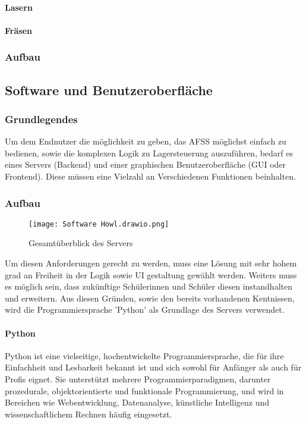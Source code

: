 \paragraph{Lasern}
\paragraph{Fräsen}

\subsubsection{Aufbau}

\subsection{Software und Benutzeroberfläche}

\subsubsection{Grundlegendes}

Um dem Endnutzer die möglichkeit zu geben, das AFSS möglichst einfach zu bedienen, sowie die komplexen Logik zu Lagersteuerung auszuführen, bedarf es eines Servers (Backend) und einer graphischen Benutzeroberfläche (GUI oder Frontend). Diese müssen eine Vielzahl an Verschiedenen Funktionen beinhalten.

\subsubsection{Aufbau}
\begin{figure}[h]
    \texttt{[image: Software Howl.drawio.png]}
    \caption{Gesamtüberblick des Servers}
\end{figure}

Um diesen Anforderungen gerecht zu werden, muss eine Lösung mit sehr hohem grad an Freiheit in der Logik sowie UI gestaltung gewählt werden. Weiters muss es möglich sein, dass zukünftige Schülerinnen und Schüler diesen instandhalten und erweitern. Aus diesen Gründen, sowie den bereits vorhandenen Kentnissen, wird die Programmiersprache 'Python' als Grundlage des Servers verwendet.

\paragraph{Python}
Python ist eine vielseitige, hochentwickelte Programmiersprache, die für ihre Einfachheit und Lesbarkeit bekannt ist und sich sowohl für Anfänger als auch für Profis eignet. Sie unterstützt mehrere Programmierparadigmen, darunter prozedurale, objektorientierte und funktionale Programmierung, und wird in Bereichen wie Webentwicklung, Datenanalyse, künstliche Intelligenz und wissenschaftlichem Rechnen häufig eingesetzt. \cite{python_wp}

